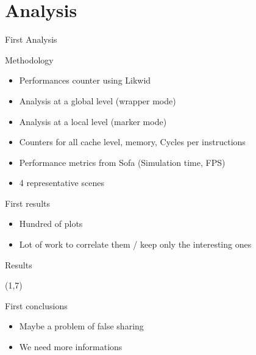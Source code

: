 \documentclass[xcolor={usenames,dvipsnames}]{beamer}
\newcommand{\sectiontitle}{}
\newcommand{\newsection}[1]{\renewcommand{\sectiontitle}{#1}\section{#1}}
\begin{document}
\newsection{Analysis}

\begin{frame}{First Analysis}
    \begin{block}{Methodology}
        \begin{itemize}
            \item Performances counter using Likwid \cite{Treibig10LIKWID}
            \item Analysis at a global level (wrapper mode)
            \item Analysis at a local level (marker mode)
            \item Counters for all cache level, memory, Cycles per instructions
            \item Performance metrics from Sofa (Simulation time, FPS)
            \item 4 representative scenes
        \end{itemize}
    \end{block}
    \pause
    \begin{exampleblock}{First results}
        \begin{itemize}
            \item Hundred of plots
            \item Lot of work to correlate them / keep only the interesting ones
        \end{itemize}
    \end{exampleblock}
\end{frame}

\begin{frame}{Results}

    {
        \begin{textblock}{14}(1,7)
            \begin{alertblock}{First conclusions}
                \begin{itemize}
                    \item Maybe a problem of false sharing
                    \item We need more informations
                \end{itemize}
            \end{alertblock}
        \end{textblock}
    }
\end{frame}
\end{document}
